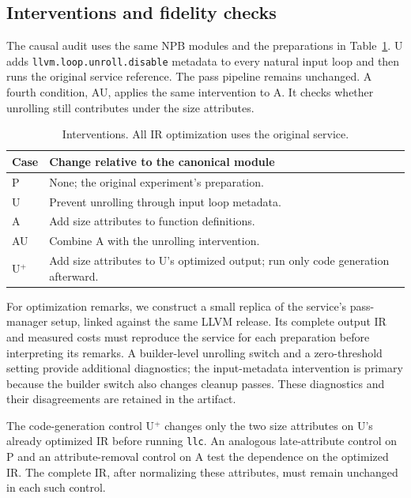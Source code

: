 \documentclass[conference,a4paper]{IEEEtran}
\begin{document}
\subsection{Interventions and fidelity checks}
The causal audit uses the same \NpbCount{} NPB modules and the
preparations in Table~\ref{tab:interventions}. U adds
\texttt{llvm.loop.\allowbreak unroll.\allowbreak disable} metadata to every natural input loop
and then runs the original service reference. The pass pipeline remains
unchanged. A fourth condition, AU, applies the same intervention to A.
It checks whether unrolling still contributes under the size attributes.

\begin{table}[t]
\caption{Interventions. All IR optimization uses the original service.}
\label{tab:interventions}
\centering\small
\begin{tabular}{@{}lp{}@{}}
\toprule
Case & Change relative to the canonical module \\
\midrule
P & None; the original experiment's preparation. \\
U & Prevent unrolling through input loop metadata. \\
A & Add size attributes to function definitions. \\
AU & Combine A with the unrolling intervention. \\
U$^+$ & Add size attributes to U's optimized output; run only code generation afterward. \\
\bottomrule
\end{tabular}
\end{table}

For optimization remarks, we construct a small replica of the service's
pass-manager setup, linked against the same LLVM release. Its complete
output IR and measured costs must reproduce the service for each
preparation before interpreting its remarks. A builder-level unrolling
switch and a zero-threshold setting provide additional diagnostics;
the input-metadata intervention is primary because the builder switch
also changes cleanup passes. These diagnostics and their disagreements
are retained in the artifact.

The code-generation control U$^+$ changes only the two size attributes
on U's already optimized IR before running \texttt{llc}. An analogous
late-attribute control on P and an attribute-removal control on A test
the dependence on the optimized IR. The complete IR, after normalizing
these attributes, must remain unchanged in each such control.
\end{document}

